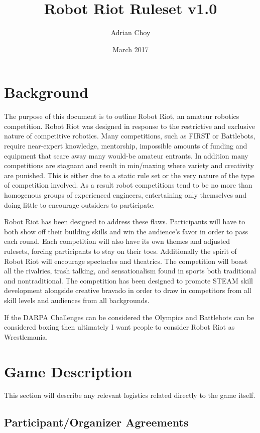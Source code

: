 \documentclass{article}
\title{Robot Riot Ruleset v1.0}
\author{Adrian Choy}
\date{March 2017}
\begin{document}
   \maketitle
   \section {Background}
   	The purpose of this document is to outline Robot Riot, an amateur robotics competition. Robot Riot was designed in response to the restrictive and exclusive nature of competitive robotics. Many competitions, such as FIRST or Battlebots, require near-expert knowledge, mentorship, impossible amounts of funding and equipment that scare away many would-be amateur entrants. In addition many competitions are stagnant and result in min/maxing where variety and creativity are punished. This is either due to a static rule set or the very nature of the type of competition involved. As a result robot competitions tend to be no more than homogenous groups of experienced engineers, entertaining only themselves and doing little to encourage outsiders to participate.
	
	Robot Riot has been designed to address these flaws. Participants will have to both show off their building skills and win the audience's favor in order to pass each round. Each competition will also have its own themes and adjusted rulesets, forcing participants to stay on their toes. Additionally the spirit of Robot Riot will encourage spectacles and theatrics. The competition will boast all the rivalries, trash talking, and sensationalism found in sports both traditional and nontraditional. The competition has been designed to promote STEAM skill development alongside creative bravado in order to draw in competitors from all skill levels and audiences from all backgrounds.
	
	If the DARPA Challenges can be considered the Olympics and Battlebots can be considered boxing then ultimately I want people to consider Robot Riot as Wrestlemania.
   
   \section {Game Description}
   	
	This section will describe any relevant logistics related directly to the game itself.
	 	
	   \subsection {Participant/Organizer Agreements}
	   	
\end{document}
